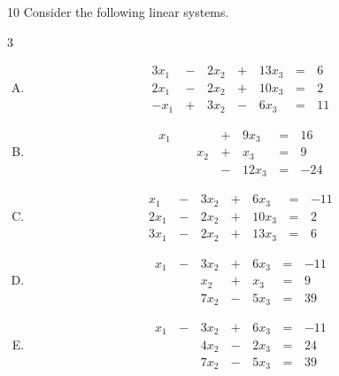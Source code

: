 \begin{applicationActivities}
\begin{activity}{10}
  Consider the following  linear systems.
  \begin{multicols}{3}\noindent
  \begin{enumerate}[(A)]
    \item \[
		\begin{alignedat}{4}
   		  3x_1 &\,-\,& 2x_2 &\,+\,& 13x_3 &\,=\,& 6 \\
   		  2x_1 &\,-\,& 2x_2 &\,+\,& 10x_3 &\,=\,& 2 \\
   		  -x_1 &\,+\,& 3x_2 &\,-\,&  6x_3 &\,=\,& 11 
   		\end{alignedat}
	\]
%
	\item \[
		\begin{alignedat}{4}
	   		x_1 &     &      &\,+\,& 9x_3 &\,=\,& 16 \\
	       	&  \,\,\,   & x_2 &\,+\,& x_3 &\,=\,& 9 \\
	       		&     &      &\,-\,& 12x_3 &\,=\,& -24 
		\end{alignedat}
	\]
%
   \item \[
		\begin{alignedat}{4}
    		x_1 &\,-\,& 3x_2 &\,+\,&  6x_3 &\,=\,& -11 \\
		   2x_1 &\,-\,& 2x_2 &\,+\,& 10x_3 &\,=\,& 2 \\
		   3x_1 &\,-\,& 2x_2 &\,+\,& 13x_3 &\,=\,& 6 
    	\end{alignedat}
	\]
%
   	\item \[
		\begin{alignedat}{4}
	   		x_1 &\,-\,& 3x_2 &\,+\,& 6x_3 &\,=\,& -11 \\
	   		    &     & x_2 &\,+\,& x_3 &\,=\,& 9 \\
	   		    &     & 7x_2 &\,-\,& 5x_3 &\,=\,& 39 
		\end{alignedat}
	\]

   	\item \[
		\begin{alignedat}{4}
	   		x_1 &\,-\,& 3x_2 &\,+\,& 6x_3 &\,=\,& -11 \\
	   		    &     & 4x_2 &\,-\,& 2x_3 &\,=\,& 24 \\
	   		    &     & 7x_2 &\,-\,& 5x_3 &\,=\,& 39 
		\end{alignedat}
	\]


\end{enumerate}
\end{multicols}
\end{activity}
\end{applicationActivities}
